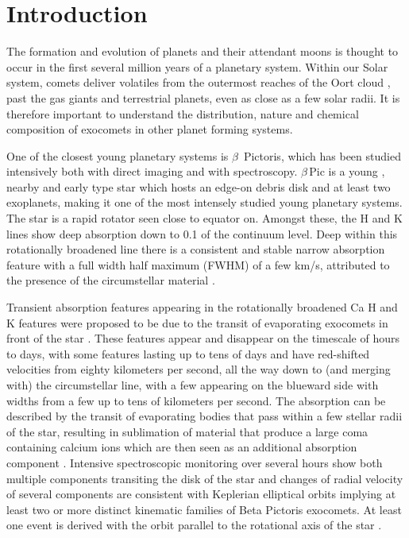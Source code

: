 \documentclass{aa}
\newcommand{\kms}{km s$^{-1}$}
\newcommand{\bp}{$\beta$\,Pic}
\begin{document}

   \maketitle

\section{Introduction}

The formation and evolution of planets and their attendant moons is thought to occur in the first several million years of a planetary system.
%
Within our Solar system, comets deliver volatiles from the outermost reaches of the Oort cloud \citep{Obrien2018}, past the gas giants and terrestrial planets, even as close as a few solar radii.
%
It is therefore important to understand the distribution, nature and chemical composition of exocomets in other planet forming systems.

One of the closest young planetary systems is $\beta$~Pictoris, which has been studied intensively both with direct imaging and with spectroscopy.
%
\bp{} is a young \citep[$\sim 25$ Myr; see ][ for discussions]{Lee24}, nearby \citep[$19.63\pm 0.06$ pc, ][]{Lindegren21} and early type star \citep[A6V; ][]{Gray06} which hosts an edge-on debris disk and at least two exoplanets, making it one of the most intensely studied young planetary systems.
%
The star is a rapid rotator \citep[$124\pm 3$\,\kms{}; ][]{Koen03} seen close to equator on.
%
Amongst these, the  H and K lines show deep absorption down to 0.1 of the continuum level.
%
Deep within this rotationally broadened line there is a consistent and stable narrow absorption feature with a full width half maximum (FWHM) of a few km/s, attributed to the presence of the circumstellar material \citep{Hobbs85,VidalMadjar86}.

Transient absorption features appearing in the rotationally broadened Ca H and K features were proposed to be due to the transit of evaporating exocomets in front of the star \citep{Ferlet87}.
%
These features appear and disappear on the timescale of hours to days, with some features lasting up to tens of days and have red-shifted velocities from eighty kilometers per second, all the way down to (and merging with) the circumstellar line, with a few appearing on the blueward side \citep{LagrangeHenri92} with widths from a few up to tens of kilometers per second.
%
The absorption can be described by the transit of evaporating bodies that pass within a few stellar radii of the star, resulting in sublimation of material that produce a large coma containing calcium ions which are then seen as an additional absorption component \citep{Beust91}.
%
Intensive spectroscopic monitoring over several hours show both multiple components transiting the disk of the star \citep{Beust96} and changes of radial velocity of several components are consistent with Keplerian elliptical orbits \citep{Kennedy18} implying at least two \citep{Kiefer14,Pollard24} or more \citep{Heller24} distinct kinematic families of Beta Pictoris exocomets.
%
At least one event is derived with the orbit parallel to the rotational axis of the star \citep{Tobin19}.
\end{document}
